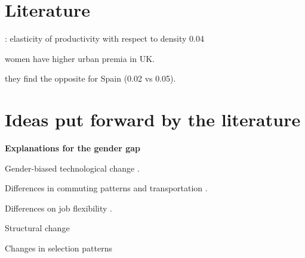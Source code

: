 \section{Literature}
\bitem
\item \cite{Duranton2020}: elasticity of productivity with respect to density 0.04
\item \cite{Phimister2005} women have higher urban premia in UK.
\item \cite{DelaRoca2017} they find the opposite for Spain (0.02 vs 0.05).
\eitem
\section{Ideas put forward by the literature}
\textbf{Explanations for the gender gap}
\bitem
	\item Gender-biased technological change \citep{Black2010}.
	\item Differences in commuting patterns and transportation \citep{Black2014,Liu2020}.
	\item Differences on job flexibility \citep{Goldin2014}.
	\item Structural change \citep{Olivetti2014,Olivetti2016}
	\item Changes in selection patterns \citep{Mulligan2008}
\eitem